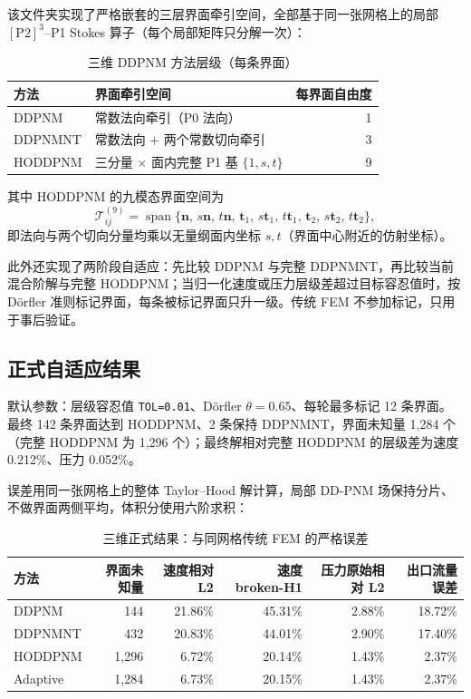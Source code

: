 \documentclass[11pt,a4paper]{ctexart}
\newcommand{\Dd}{DDPNM}
\begin{document}
该文件夹实现了严格嵌套的三层界面牵引空间，全部基于同一张网格上的局部 $[\mathrm{P2}]^3$--P1 Stokes 算子（每个局部矩阵只分解一次）：

\begin{table}[h]
\centering
\caption{三维 \Dd{} 方法层级（每条界面）}
\begin{tabular}{llr}
\toprule
方法 & 界面牵引空间 & 每界面自由度 \\
\midrule
\Dd{}      & 常数法向牵引（P0 法向） & 1 \\
\Dd{}NT    & 常数法向 + 两个常数切向牵引 & 3 \\
HODDPNM   & 三分量 $\times$ 面内完整 P1 基 $\{1,s,t\}$ & 9 \\
\bottomrule
\end{tabular}
\end{table}

其中 HODDPNM 的九模态界面空间为
\begin{equation}
  \mathcal{T}^{(9)}_{ij}
  =\operatorname{span}\{\boldsymbol{n},\,s\boldsymbol{n},\,t\boldsymbol{n},\,
  \boldsymbol{t}_1,\,s\boldsymbol{t}_1,\,t\boldsymbol{t}_1,\,
  \boldsymbol{t}_2,\,s\boldsymbol{t}_2,\,t\boldsymbol{t}_2\},
\end{equation}
即法向与两个切向分量均乘以无量纲面内坐标 $s,t$（界面中心附近的仿射坐标）。

此外还实现了两阶段自适应：先比较 \Dd{} 与完整 \Dd{}NT，再比较当前混合阶解与完整 HODDPNM；当归一化速度或压力层级差超过目标容忍值时，按 D\"orfler 准则标记界面，每条被标记界面只升一级。传统 FEM 不参加标记，只用于事后验证。

\subsection{正式自适应结果}
\label{sec:3d-adaptive-results}

默认参数：层级容忍值 \texttt{TOL=0.01}、D\"orfler $\theta=0.65$、每轮最多标记 12 条界面。最终 142 条界面达到 HODDPNM、2 条保持 \Dd{}NT，界面未知量 1{,}284 个（完整 HODDPNM 为 1{,}296 个）；最终解相对完整 HODDPNM 的层级差为速度 0.212\%、压力 0.052\%。

误差用同一张网格上的整体 Taylor--Hood 解计算，局部 DD-PNM 场保持分片、不做界面两侧平均，体积分使用六阶求积：

\begin{table}[h]
\centering
\caption{三维正式结果：与同网格传统 FEM 的严格误差}
\begin{tabular}{lrrrrr}
\toprule
方法 & 界面未知量 & 速度相对 L2 & 速度 broken-H1 & 压力原始相对 L2 & 出口流量误差 \\
\midrule
\Dd{}       & 144   & 21.86\% & 45.31\% & 2.88\% & 18.72\% \\
\Dd{}NT     & 432   & 20.83\% & 44.01\% & 2.90\% & 17.40\% \\
HODDPNM    & 1{,}296 & 6.72\%  & 20.14\% & 1.43\% & 2.37\% \\
Adaptive   & 1{,}284 & 6.73\%  & 20.15\% & 1.43\% & 2.37\% \\
\bottomrule
\end{tabular}
\end{table}
\end{document}
